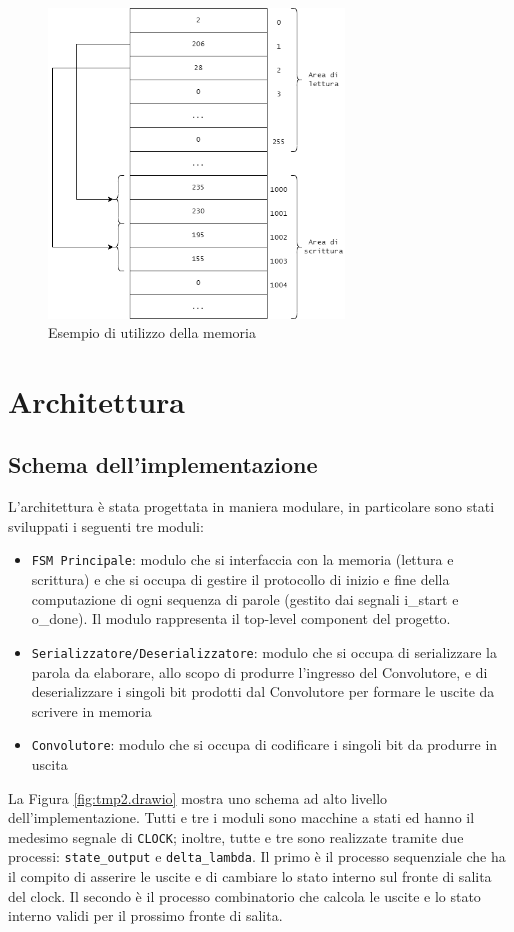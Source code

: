 \documentclass{article}
\begin{document}
\begin{figure}
\centering
\includegraphics[width=0.7\textwidth]{prov.png}
\caption{\label{fig:mem}Esempio di utilizzo della memoria}
\end{figure}

\section{Architettura}

\subsection{Schema dell'implementazione}
L'architettura è stata progettata in maniera modulare, in particolare sono stati sviluppati i seguenti tre moduli:
\begin{itemize}
    \item \texttt{FSM Principale}: modulo che si interfaccia con la memoria (lettura e scrittura) e che si occupa di gestire il protocollo di inizio e fine della computazione di ogni sequenza di parole (gestito dai segnali i\_start e o\_done). Il modulo rappresenta il top-level component del progetto.
    \item \texttt{Serializzatore/Deserializzatore}: modulo che si occupa di serializzare la parola da elaborare, allo scopo di produrre l'ingresso del Convolutore, e di deserializzare i singoli bit prodotti dal Convolutore per formare le uscite da scrivere in memoria
    \item \texttt{Convolutore}: modulo che si occupa di codificare i singoli bit da produrre in uscita
\end{itemize}
La Figura \ref{fig:tmp2.drawio} mostra uno schema ad alto livello dell'implementazione.
\newline
Tutti e tre i moduli sono macchine a stati ed hanno il medesimo segnale di \texttt{CLOCK}; inoltre, tutte e tre sono realizzate tramite due processi: \texttt{state\_output} e \texttt{delta\_lambda}. Il primo è il processo sequenziale che ha il compito di asserire le uscite e di cambiare lo stato interno sul fronte di salita del clock. Il secondo è il processo combinatorio che calcola le uscite e lo stato interno validi per il prossimo fronte di salita.
\end{document}
